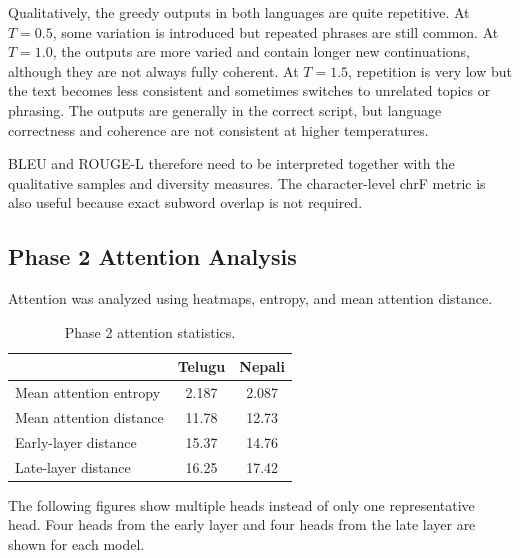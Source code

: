 \documentclass[10pt,a4paper]{article}
\begin{document}
Qualitatively, the greedy outputs in both languages are quite
repetitive. At $T=0.5$, some variation is introduced but repeated
phrases are still common. At $T=1.0$, the outputs are more varied and
contain longer new continuations, although they are not always
fully coherent. At $T=1.5$, repetition is very low but the text
becomes less consistent and sometimes switches to unrelated topics or
phrasing. The outputs are generally in the correct script, but
language correctness and coherence are not consistent at higher
temperatures.

BLEU and ROUGE-L therefore need to be interpreted together with the
qualitative samples and diversity measures. The character-level chrF
metric is also useful because exact subword overlap is not required.

\subsection{Phase 2 Attention Analysis}

Attention was analyzed using heatmaps, entropy, and mean attention
distance.

\begin{table}[H]
\centering
\small
\caption{Phase 2 attention statistics.}
\begin{tabular}{lcc}
\toprule
 & \textbf{Telugu} & \textbf{Nepali}\\
\midrule
Mean attention entropy & 2.187 & 2.087\\
Mean attention distance & 11.78 & 12.73\\
Early-layer distance & 15.37 & 14.76\\
Late-layer distance & 16.25 & 17.42\\
\bottomrule
\end{tabular}
\end{table}

The following figures show multiple heads instead of only one
representative head. Four heads from the early layer and four heads
from the late layer are shown for each model.
\end{document}
